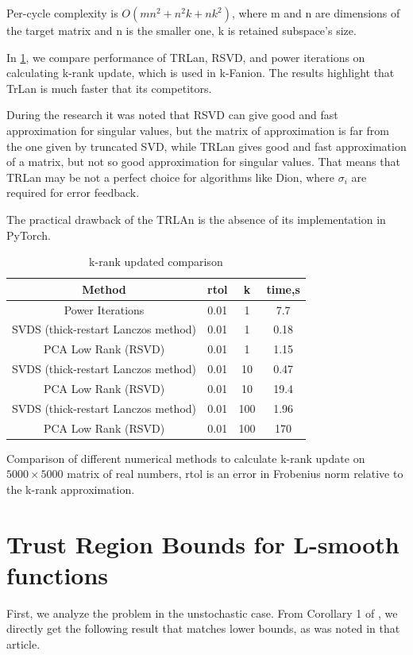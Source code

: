 \documentclass{article} %
\begin{document}
Per-cycle complexity is $O(mn^2 + n^2k + nk^2)$, where m and n are dimensions of the target matrix and n is the smaller one, k is retained subspace's size.

In \cref{tbl:matrix_methods}, we compare performance of TRLan, RSVD, and power iterations on calculating k-rank update, which is used in k-Fanion. The results highlight that TrLan is much faster that its competitors.

During the research it was noted that RSVD can give good and fast approximation for singular values, but the matrix of approximation is far from the one given by truncated SVD, while TRLan gives good and fast approximation of a matrix, but not so good approximation for singular values. That means that TRLan may be not a perfect choice for algorithms like Dion, where $\sigma_i$ are required for error feedback.

The practical drawback of the TRLAn is the absence of its implementation in PyTorch.
\begin{table}[h!]
    \centering
    \begin{tabular}{c|c|c|c}
    \hline
    Method                              & rtol        & k & time,s \\
    \hline 
    Power Iterations                    & 0.01        & 1 & 7.7\\ 
    SVDS (thick-restart Lanczos method) & 0.01        & 1 & 0.18\\
    PCA Low Rank (RSVD)                 & 0.01        & 1 & 1.15\\
    SVDS (thick-restart Lanczos method) & 0.01        & 10 & 0.47\\
    PCA Low Rank (RSVD)                 & 0.01        & 10 & 19.4\\
    SVDS (thick-restart Lanczos method) & 0.01        & 100 & 1.96\\
    PCA Low Rank (RSVD)                 & 0.01        & 100 & 170\\
    \end{tabular}
    \caption{k-rank updated comparison}
    Comparison of different numerical methods to calculate k-rank update on $5000\times5000$ matrix of real numbers, rtol is an error in Frobenius norm relative to the k-rank approximation. 
    \label{tbl:matrix_methods}
\end{table}
\section{Trust Region Bounds for L-smooth functions}
    First, we analyze the problem in the unstochastic case. From Corollary 1 of \citet{kovalev2025understanding}, we directly get the following result that matches lower bounds, as was noted in that article.
\end{document}
